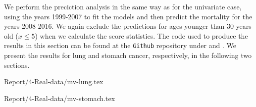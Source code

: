 


\newpar We perform the preciction analysis in the same way as for the univariate case, using the years 1999-2007 to fit the models and then predict the mortality for the years 2008-2016. We again exclude the predictions for ages younger than 30 years old ($x \leq 5$) when we calculate the score statistics. The code used to produce the results in this section can be found at the \texttt{Github} repository under  and . We present the results for lung and stomach cancer, respectively, in the following two sections.

{Report/4-Real-data/mv-lung.tex}

{Report/4-Real-data/mv-stomach.tex}

